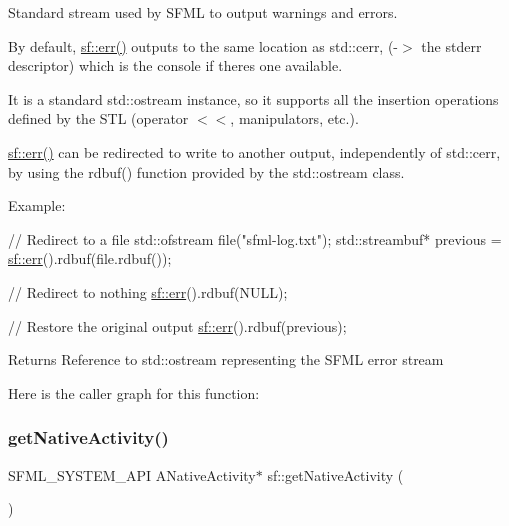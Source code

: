 Standard stream used by S\+F\+ML to output warnings and errors. 

By default, \hyperlink{group__system_ga7fe7f475639e26334606b5142c29551f}{sf\+::err()} outputs to the same location as std\+::cerr, (-\/$>$ the stderr descriptor) which is the console if there\textquotesingle{}s one available.

It is a standard std\+::ostream instance, so it supports all the insertion operations defined by the S\+TL (operator $<$$<$, manipulators, etc.).

\hyperlink{group__system_ga7fe7f475639e26334606b5142c29551f}{sf\+::err()} can be redirected to write to another output, independently of std\+::cerr, by using the rdbuf() function provided by the std\+::ostream class.

Example\+: 
\begin{DoxyCode}
\textcolor{comment}{// Redirect to a file}
std::ofstream file(\textcolor{stringliteral}{"sfml-log.txt"});
std::streambuf* previous = \hyperlink{group__system_ga7fe7f475639e26334606b5142c29551f}{sf::err}().rdbuf(file.rdbuf());

\textcolor{comment}{// Redirect to nothing}
\hyperlink{group__system_ga7fe7f475639e26334606b5142c29551f}{sf::err}().rdbuf(NULL);

\textcolor{comment}{// Restore the original output}
\hyperlink{group__system_ga7fe7f475639e26334606b5142c29551f}{sf::err}().rdbuf(previous);
\end{DoxyCode}


\begin{DoxyReturn}{Returns}
Reference to std\+::ostream representing the S\+F\+ML error stream 
\end{DoxyReturn}
Here is the caller graph for this function\+:
\mbox{\label{group__system_ga9f5460043bdbd5be0ccccd2e6f0ddc41}} 
\subsubsection{\texorpdfstring{get\+Native\+Activity()}{getNativeActivity()}}
{\footnotesize\ttfamily S\+F\+M\+L\+\_\+\+S\+Y\+S\+T\+E\+M\+\_\+\+A\+PI A\+Native\+Activity$\ast$ sf\+::get\+Native\+Activity (\begin{DoxyParamCaption}{ }\end{DoxyParamCaption})}



